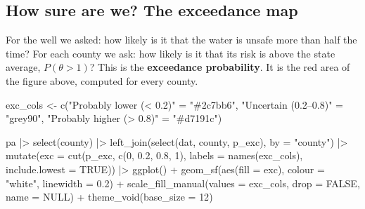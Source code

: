 \documentclass[
  letterpaper,
  DIV=11,
  numbers=noendperiod]{scrartcl}
\newenvironment{Shaded}{\begin{snugshade}}{\end{snugshade}}
\newcommand{\AttributeTok}[1]{\textcolor[rgb]{0.40,0.45,0.13}{#1}}
\newcommand{\CommentTok}[1]{\textcolor[rgb]{0.37,0.37,0.37}{#1}}
\newcommand{\ConstantTok}[1]{\textcolor[rgb]{0.56,0.35,0.01}{#1}}
\newcommand{\ControlFlowTok}[1]{\textcolor[rgb]{0.00,0.23,0.31}{\textbf{#1}}}
\newcommand{\DecValTok}[1]{\textcolor[rgb]{0.68,0.00,0.00}{#1}}
\newcommand{\FloatTok}[1]{\textcolor[rgb]{0.68,0.00,0.00}{#1}}
\newcommand{\FunctionTok}[1]{\textcolor[rgb]{0.28,0.35,0.67}{#1}}
\newcommand{\NormalTok}[1]{\textcolor[rgb]{0.00,0.23,0.31}{#1}}
\newcommand{\OtherTok}[1]{\textcolor[rgb]{0.00,0.23,0.31}{#1}}
\newcommand{\SpecialCharTok}[1]{\textcolor[rgb]{0.37,0.37,0.37}{#1}}
\newcommand{\StringTok}[1]{\textcolor[rgb]{0.13,0.47,0.30}{#1}}
\begin{document}
\subsection{How sure are we? The exceedance
map}\label{how-sure-are-we-the-exceedance-map}

For the well we asked: how likely is it that the water is unsafe more
than half the time? For each county we ask: how likely is it that its
risk is above the state average, \(P(\theta > 1)\)? This is the
\textbf{exceedance probability}. It is the red area of the figure above,
computed for every county.

\begin{Shaded}
\end{Shaded}

\begin{Shaded}
\begin{Highlighting}[]
\NormalTok{exc\_cols }\OtherTok{\textless{}{-}} \FunctionTok{c}\NormalTok{(}\StringTok{"Probably lower (\textless{} 0.2)"}  \OtherTok{=} \StringTok{"\#2c7bb6"}\NormalTok{,}
              \StringTok{"Uncertain (0.2–0.8)"}     \OtherTok{=} \StringTok{"grey90"}\NormalTok{,}
              \StringTok{"Probably higher (\textgreater{} 0.8)"} \OtherTok{=} \StringTok{"\#d7191c"}\NormalTok{)}

\NormalTok{pa }\SpecialCharTok{|\textgreater{}}
  \FunctionTok{select}\NormalTok{(county) }\SpecialCharTok{|\textgreater{}}
  \FunctionTok{left\_join}\NormalTok{(}\FunctionTok{select}\NormalTok{(dat, county, p\_exc), }\AttributeTok{by =} \StringTok{"county"}\NormalTok{) }\SpecialCharTok{|\textgreater{}}
  \FunctionTok{mutate}\NormalTok{(}\AttributeTok{exc =} \FunctionTok{cut}\NormalTok{(p\_exc, }\FunctionTok{c}\NormalTok{(}\DecValTok{0}\NormalTok{, }\FloatTok{0.2}\NormalTok{, }\FloatTok{0.8}\NormalTok{, }\DecValTok{1}\NormalTok{), }\AttributeTok{labels =} \FunctionTok{names}\NormalTok{(exc\_cols),}
                   \AttributeTok{include.lowest =} \ConstantTok{TRUE}\NormalTok{)) }\SpecialCharTok{|\textgreater{}}
  \FunctionTok{ggplot}\NormalTok{() }\SpecialCharTok{+}
  \FunctionTok{geom\_sf}\NormalTok{(}\FunctionTok{aes}\NormalTok{(}\AttributeTok{fill =}\NormalTok{ exc), }\AttributeTok{colour =} \StringTok{"white"}\NormalTok{, }\AttributeTok{linewidth =} \FloatTok{0.2}\NormalTok{) }\SpecialCharTok{+}
  \FunctionTok{scale\_fill\_manual}\NormalTok{(}\AttributeTok{values =}\NormalTok{ exc\_cols, }\AttributeTok{drop =} \ConstantTok{FALSE}\NormalTok{, }\AttributeTok{name =} \ConstantTok{NULL}\NormalTok{) }\SpecialCharTok{+}
  \FunctionTok{theme\_void}\NormalTok{(}\AttributeTok{base\_size =} \DecValTok{12}\NormalTok{)}
\end{Highlighting}
\end{Shaded}
\end{document}
